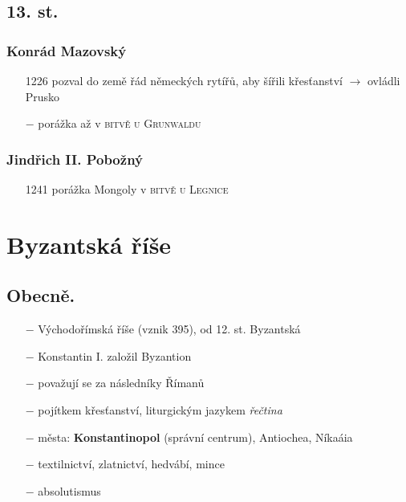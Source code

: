 \documentclass{article}
\begin{document}
\subsection*{13. st.}

\subsubsection*{Konrád Mazovský}
\begin{itemize}
    \vspace{-0.5em}
    \setlength\itemsep{0.15em}
    \item[1226] pozval do země řád německých rytířů, aby šířili křesťanství $\rightarrow$ ovládli Prusko
    \item[$-$] porážka až v \textsc{bitvě u Grunwaldu}
\end{itemize}

\subsubsection*{Jindřich II. Pobožný}
\begin{itemize}
    \vspace{-0.5em}
    \setlength\itemsep{0.15em}
    \item[1241] porážka Mongoly v \textsc{bitvě u Legnice}
\end{itemize}


\section*{Byzantská říše}

\subsection*{Obecně.}
\begin{itemize}
    \vspace{-0.5em}
    \setlength\itemsep{0.15em}
    \item[$-$] Východořímská říše (vznik 395), od 12. st. Byzantská
    \item[$-$] Konstantin I. založil Byzantion
    \item[$-$] považují se za následníky Římanů
    \item[$-$] pojítkem křesťanství, liturgickým jazykem \textit{řečtina}
    \item[$-$] města: \textbf{Konstantinopol} (správní centrum), Antiochea, Níkaáia
    \item[$-$] textilnictví, zlatnictví, hedvábí, mince
    \item[$-$] absolutismus
\end{itemize}
\end{document}
